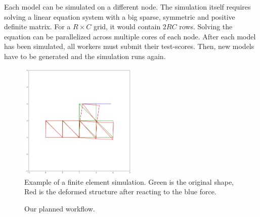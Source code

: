 \documentclass[12pt]{article}
\begin{document}
Each model can be simulated on a different node. The simulation itself requires solving a linear equation system with a big sparse, symmetric and positive definite matrix. For a $R \times C$ grid, it would contain ${2RC}$ rows. Solving the equation can be parallelized across multiple cores of each node. After each model has been simulated, all workers must submit their test-scores. Then, new models have to be generated and the simulation runs again.





\begin{figure}[p]
    \centering
    \includegraphics[width=0.5\textwidth]{images/finiteElements.png}
    \caption{Example of a finite element simulation. Green is the original shape, Red is the deformed structure after reacting to the blue force.}
    \label{fig:finiteElements}
\end{figure}

\begin{figure}[p]
    \centering
    \caption{Our planned workflow.}
    \label{fig:workflow}
\end{figure}
\end{document}
